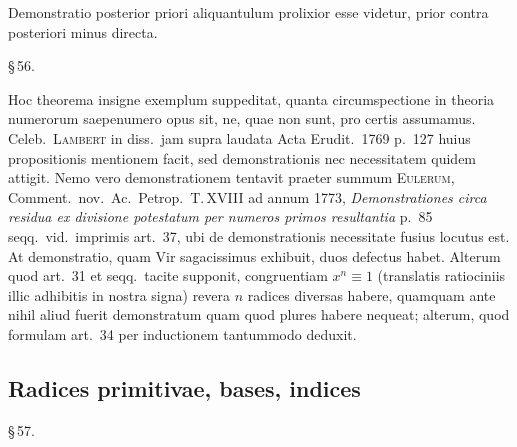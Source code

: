 \documentclass[12pt,a4paper]{article}
\theoremstyle{plain}
\theoremstyle{definition}
\theoremstyle{remark}
\begin{document}
Demonstratio posterior priori aliquantulum prolixior esse videtur, prior contra posteriori minus directa.

\begin{center}\S\,56.\end{center}

Hoc theorema insigne exemplum suppeditat, quanta circumspectione in theoria numerorum saepenumero opus sit, ne, quae non sunt, pro certis assumamus. Celeb.\ \textsc{Lambert} in diss.\ jam supra laudata Acta Erudit.\ 1769 p.~127 huius propositionis mentionem facit, sed demonstrationis nec necessitatem quidem attigit. Nemo vero demonstrationem tentavit praeter summum \textsc{Eulerum}, Comment.\ nov.\ Ac.\ Petrop.\ T.\,XVIII ad annum 1773, \emph{Demonstrationes circa residua ex divisione potestatum per numeros primos resultantia} p.~85 seqq.\ vid.\ imprimis art.~37, ubi de demonstrationis necessitate fusius locutus est. At demonstratio, quam Vir sagacissimus exhibuit, duos defectus habet. Alterum quod art.~31 et seqq.\ tacite supponit, congruentiam $x^n \equiv 1$ (translatis ratiociniis illic adhibitis in nostra signa) revera $n$ radices diversas habere, quamquam ante nihil aliud fuerit demonstratum quam quod plures habere nequeat; alterum, quod formulam art.~34 per inductionem tantummodo deduxit.

\subsection*{Radices primitivae, bases, indices}

\begin{center}\S\,57.\end{center}
\end{document}
